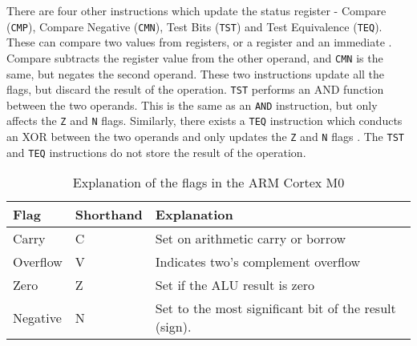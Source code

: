 \documentclass[12pt,a4paper]{article}
\begin{document}
\begin{bibunit}[is-unsrt]
There are four other instructions which update the status register - Compare (\texttt{CMP}), Compare Negative (\texttt{CMN}), Test Bits (\texttt{TST}) and Test Equivalence (\texttt{TEQ}).
These can compare two values from registers, or a register and an immediate \cite{ARM:CMPCMN}.
Compare subtracts the register value from the other operand, and \texttt{CMN} is the same, but negates the second operand.
These two instructions update all the flags, but discard the result of the operation.
\texttt{TST} performs an AND function between the two operands. 
This is the same as an \texttt{AND} instruction, but only affects the \texttt{Z} and \texttt{N} flags.
Similarly, there exists a \texttt{TEQ} instruction which conducts an XOR between the two operands and only updates the \texttt{Z} and \texttt{N} flags \cite{ARM:TSTTEQ}.
The \texttt{TST} and \texttt{TEQ} instructions do not store the result of the operation.


%

%  
\begin{table}
\centering
\caption{Explanation of the flags in the ARM Cortex M0}
\label{tab:m0:flags}
\begin{tabular}{p{}p{}p{}}\hline
Flag & Shorthand & Explanation \\ \hline
Carry & C & Set on arithmetic carry or borrow\\
Overflow & V & Indicates two's complement overflow\\
Zero & Z & Set if the ALU result is zero\\
Negative & N & Set to the most significant bit of the result (sign). \\
\end{tabular}
\end{table}
%  

\end{bibunit}
\end{document}
